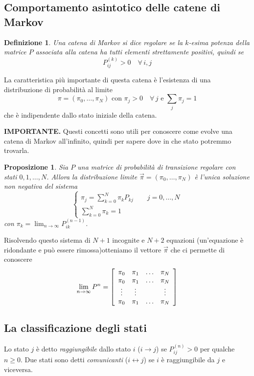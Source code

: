 \documentclass{article}
\newtheorem{definizione}{Definizione}[section]
\newtheorem{proposizione}{Proposizione}[section]
\begin{document}
\subsection{Comportamento asintotico delle catene di Markov}

\begin{definizione}
Una catena di Markov si dice \textit{regolare} se la $k$-esima potenza della matrice $P$ associata alla catena ha tutti elementi strettamente positivi, quindi se
$$
P_{ij}^{(k)} > 0\quad \forall\,i,j
$$
\end{definizione}
La caratteristica più importante di questa catena è l'esistenza di una distribuzione di probabilità al limite
$$
\pi = (\pi_0,\hdots,\pi_N) \text{ con } \pi_j > 0 \quad \forall\,j \text{ e } \sum_j \pi_j = 1
$$
che è indipendente dallo stato iniziale della catena.\\

\begin{boxedminipage}{\textwidth}
\textbf{IMPORTANTE.} Questi concetti sono utili per conoscere come evolve una catena di Markov all'infinito, quindi per sapere dove in che stato potremmo trovarla.
\begin{proposizione}
Sia $P$ una matrice di probabilità di transizione regolare con stati $0,1,\hdots,N$. Allora la distribuzione limite $\vec{\pi} = (\pi_0,\hdots,\pi_N)$ è l'unica soluzione non negativa del sistema
$$
\left\{\begin{array}{l}
\pi_j = \sum_{k=0}^N \pi_k P_{kj}\qquad j = 0,\hdots,N\\
\sum_{k=0}^N \pi_k = 1
\end{array}
$$
con $\pi_k = \lim_{n \to \infty} P_{ik}^{(n-1)}$.
\end{proposizione}
Risolvendo questo sistema di $N+1$ incognite e $N+2$ equazioni (un'equazione è ridondante e può essere rimossa)otteniamo il vettore $\vec{\pi}$ che ci permette di conoscere
\begin{align*}
\lim_{n\to\infty} P^n = \left[\begin{array}{c c c c}
\pi_0 & \pi_1 & \hdots & \pi_N\\
\pi_0 & \pi_1 & \hdots & \pi_N\\
\vdots & \vdots & & \vdots\\
\pi_0 & \pi_1 & \hdots & \pi_N
\end{array}\right]
\end{align*} 
\end{boxedminipage}

\subsection{La classificazione degli stati}
Lo stato $j$ è detto \textit{raggiungibile} dallo stato $i$ ($i \to j$) se $P_{ij}^{(n)} > 0$ per qualche $n \ge 0$. Due stati sono detti \textit{comunicanti} ($i \leftrightarrow j$) se $i$ è raggiungibile da $j$ e viceversa.
\end{document}

